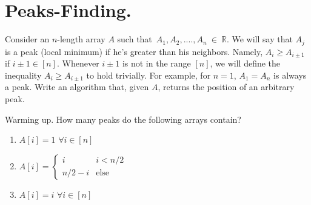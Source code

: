
\section{Peaks-Finding.}
\begin{example}
Consider an \(n\)-length array $A$ such that~$A_1,A_2,....,A_n~\in~\mathbb{R}$. We will say that $A_{j}$ is a peak (local minimum) if he's greater than his neighbors. Namely, $A_{i} \ge A_{i\pm1}$ if $i\pm 1 \in [n]$. Whenever $i\pm 1$ is not in the range $[n]$, we will define the inequality $A_{i} \ge A_{i\pm 1}$ to hold trivially. For example, for $n=1$, $A_{1}=A_{n}$ is always a peak. Write an algorithm that, given $A$, returns the position of an arbitrary peak.
\end{example}


\begin{example}{Warming up.} \label{example:func} How many peaks do the following arrays contain?
  \begin{enumerate}
    \item $A[i] = 1$   $\forall i \in [n]$
    \item $A[i] = \begin{cases}
        i & i < n/2 \\
        n/2 - i & \text{else}
      \end{cases}$
    \item $A[i] = i $  $\forall i \in [n]$
  \end{enumerate}
\end{example}

